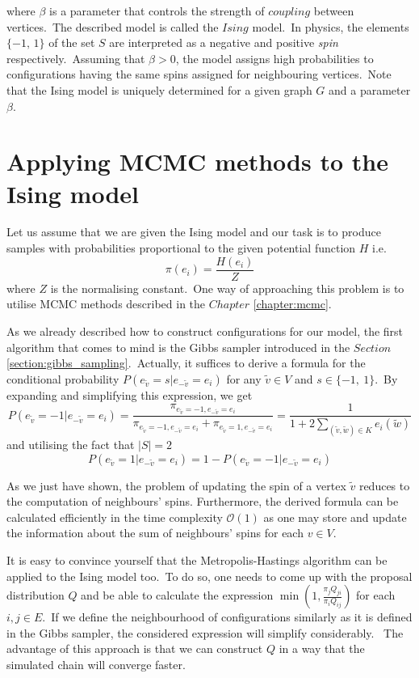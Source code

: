 \documentclass[a4paper, 11pt, onecolumn, openany, titlepage]{report}
\theoremstyle{default_theorem_style}\newtheorem{theorem}{Theorem}
\theoremstyle{default_theorem_style}\newtheorem{definition}{Definition}
\begin{document}
where $\beta$ is a parameter that controls the strength of $coupling$ between vertices.\ The described model is called
the $Ising$ model.\ In physics, the elements $\{-1, \, 1\}$ of the set $S$ are interpreted as a negative and positive
\textit{spin} respectively.\ Assuming that $\beta > 0$, the model assigns high probabilities to configurations
having the same spins assigned for neighbouring vertices.\ Note that the Ising model is uniquely determined for
a given graph $G$ and a parameter $\beta$.

\section{Applying MCMC methods to the Ising model}

Let us assume that we are given the Ising model and our task is to produce samples with probabilities proportional to
the given potential function $H$ i.e.
$$
\pi(e_i) = \frac{H(e_i)}{Z}
$$
where $Z$ is the normalising constant.\ One way of approaching this problem is to utilise MCMC methods described in
the $Chapter$ \ref{chapter:mcmc}.\newline

As we already described how to construct configurations for our model, the first algorithm that comes to mind is
the Gibbs sampler introduced in the $Section$ \ref{section:gibbs_sampling}.\ Actually, it suffices to derive a formula
for the conditional probability $P(e_{\tilde{v}} = s | e_{-\tilde{v}} = e_i)$ for any $\tilde{v} \in V$ and
$s \in \{-1,\ 1\}$.\ By expanding and simplifying this expression, we get
$$
P(e_{\tilde{v}} = -1 | e_{-\tilde{v}} = e_i) =
\frac{\pi_{e_{\tilde{v}} = -1,e_{-\tilde{v}} = e_i}}
{\pi_{e_{\tilde{v}} = -1,e_{-\tilde{v}} = e_i} + \pi_{e_{\tilde{v}} = 1,e_{-\tilde{v}} = e_i}} =
\frac{1}{1 + 2 \sum\limits_{(\tilde{v}, \tilde{w}) \in K} e_i(\tilde{w})}
$$
and utilising the fact that $|S| = 2$
$$
P(e_{\tilde{v}} = 1 | e_{-\tilde{v}} = e_i) = 1 - P(e_{\tilde{v}} = -1 | e_{-\tilde{v}} = e_i)
$$

As we just have shown, the problem of updating the spin of a vertex $\tilde{v}$ reduces to the computation of
neighbours' spins. Furthermore, the derived formula can be calculated efficiently in the time
complexity $\mathcal{O}(1)$ as one may store and update the information about the sum of neighbours'
spins for each $v \in V$.\newline

It is easy to convince yourself that the Metropolis-Hastings algorithm can be applied to the Ising model
too.\ To do so, one needs to come up with the proposal distribution $Q$ and be able to calculate the expression
$\min{(1, \frac{\pi_j Q_{ji}}{\pi_i Q_{ij}})}$ for each $i, j \in E$.\ If we define the neighbourhood of configurations
similarly as it is defined in the Gibbs sampler, the considered expression will simplify considerably. \ The
advantage of this approach is that we can construct $Q$ in a way that the simulated chain will converge faster.\newline
\end{document}
